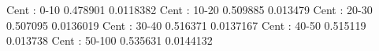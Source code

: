 Cent : 0-10
0.478901 0.0118382
Cent : 10-20
0.509885 0.013479
Cent : 20-30
0.507095 0.0136019
Cent : 30-40
0.516371 0.0137167
Cent : 40-50
0.515119 0.013738
Cent : 50-100
0.535631 0.0144132

